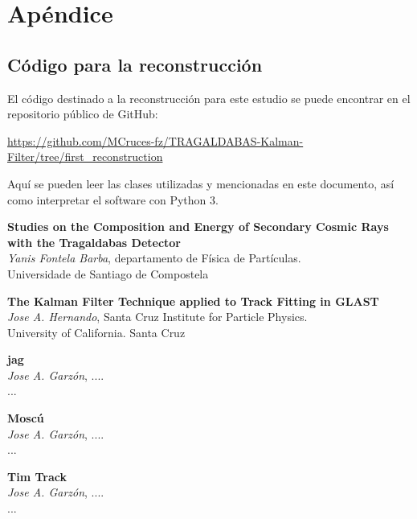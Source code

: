 \documentclass[a4paper]{article}
\begin{document}
\section{Apéndice}

\subsection{Código para la reconstrucción}

El código destinado a la reconstrucción para este estudio se puede encontrar en el repositorio público de GitHub:

\url{https://github.com/MCruces-fz/TRAGALDABAS-Kalman-Filter/tree/first_reconstruction}

Aquí se pueden leer las clases utilizadas y mencionadas en este documento, así como interpretar el software con \textsf{Python 3}.


\begin{thebibliography}{9}
    \textbf{Studies on the Composition and Energy of Secondary Cosmic Rays with the Tragaldabas Detector}\\
    \textit{Yanis Fontela Barba}, departamento de Física de Partículas.\\
    \textsf{Universidade de Santiago de Compostela}

    \textbf{The Kalman Filter Technique applied to Track Fitting in GLAST}\\
    \textit{Jose A. Hernando}, Santa Cruz Institute for Particle Physics.\\
    \textsf{University of California. Santa Cruz}

    \textbf{jag}\\
    \textit{Jose A. Garzón}, ....\\
    \textsf{...}

    \textbf{Moscú}\\
    \textit{Jose A. Garzón}, ....\\
    \textsf{...}

    \textbf{Tim Track}\\
    \textit{Jose A. Garzón}, ....\\
    \textsf{...}
\end{thebibliography}
\end{document}
